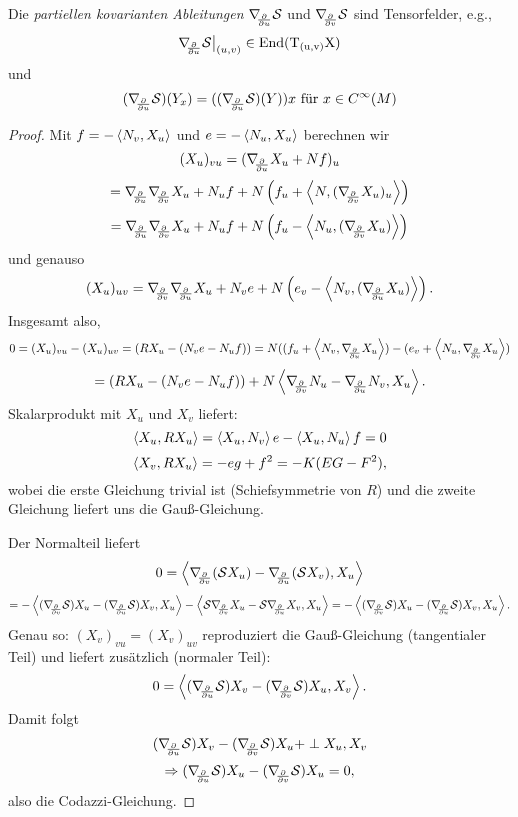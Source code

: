 \begin{remark}
	
	Die \emph{partiellen kovarianten Ableitungen} $ \nabla_{\!\!{\partial\over \partial u}} \mathcal S $ und $ \nabla_{\!\!{\partial\over \partial v}} \mathcal S $ sind Tensorfelder, e.g.,
		\[ \nabla_{\!\!{\partial\over \partial u}} \mathcal S\big|_{(u,v)} \in \mathrm{End(T_{(u,v)}X)} \] und
		\[ ( \nabla_{\!\!{\partial\over \partial u}}\mathcal S )(Y_x) = ((\nabla_{\!\!{\partial\over \partial u}} \mathcal S) (Y))x \text{ für } x \in C^\infty(M) \]
	
\end{remark}

\begin{proof}
	
	Mit $ f = - \left \langle N_v,X_u \right\rangle $ und $ e= - \left \langle N_u,X_u \right\rangle $ berechnen wir
		\[ (X_u)_{vu} = (\nabla_{\!\!{\partial\over \partial u}}X_u + Nf)_u \]
		\[ = \nabla_{\!\!{\partial\over \partial u}} \nabla_{\!\!{\partial\over \partial v}} X_u + N_{u}f + N\left (f_u+\left \langle N,(\nabla_{\!\!{\partial\over \partial v}}X_u)_u \right\rangle\right ) \]
		\[ = \nabla_{\!\!{\partial\over \partial u}} \nabla_{\!\!{\partial\over \partial v}} X_u + N_{u}f + N\left (f_u-\left \langle N_u,(\nabla_{\!\!{\partial\over \partial v}}X_u) \right\rangle\right ) \] 
	und genauso
		\[ (X_u)_{uv} = \nabla_{\!\!{\partial\over \partial v}} \nabla_{\!\!{\partial\over \partial u}} X_u + N_{v}e + N\left (e_v - \left \langle N_v,(\nabla_{\!\!{\partial\over \partial u}}X_u) \right\rangle\right ). \]
	Insgesamt also,
		\[ 0 = (X_u)_{vu} - (X_u)_{uv} = (RX_u - (N_ve - N_uf)) = N(( f_u + \left \langle N_v,\nabla_{\!\!{\partial\over \partial u}}X_u \right\rangle ) - ( e_v + \left \langle  N_u, \nabla_{\!\!{\partial\over \partial v}}X_u \right\rangle ) \]
		\[ = (RX_u - (N_ve -N_uf) ) + N \left \langle  \nabla_{\!\!{\partial\over \partial v}} N_u - \nabla_{\!\!{\partial\over \partial u}}N_v, X_u \right\rangle. \]
	Skalarprodukt mit $ X_u $ und $ X_v $ liefert:
		\[ \left \langle X_u,RX_u \right\rangle = \left \langle X_u,N_v \right\rangle e - \left \langle X_u,N_u \right\rangle f = 0 \]
		\[ \left \langle X_v,RX_u \right\rangle = -eg + f^2 = - K(EG - F^2), \]
	wobei die erste Gleichung trivial ist (Schiefsymmetrie von $ R $) und die zweite Gleichung liefert uns die Gauß-Gleichung.
	
	Der Normalteil liefert 
		\[ 0 = \left \langle \nabla_{\!\!{\partial\over \partial v}}(\mathcal S X_u) - \nabla_{\!\!{\partial\over \partial u}}(\mathcal S X_v),X_u  \right\rangle \]
		\[= - \skal{(\nabla_{\!\!{\partial\over \partial v}}\s)X_u - (\nabla_{\!\!{\partial\over \partial u}}\s)X_v,X_u} - \skal{\s \nabla_{\!\!{\partial\over \partial v}}X_u- \s \nabla_{\!\!{\partial\over \partial u}} X_v,X_u } = - \skal{(\nabla_{\!\!{\partial\over \partial v}}\s)X_u - (\nabla_{\!\!{\partial\over \partial u}}\s)X_v,X_u}. \]
	Genau so:
		$ (X_v)_{vu}=(X_v)_{uv} $ reproduziert die Gauß-Gleichung (tangentialer Teil) und liefert zusätzlich (normaler Teil):
			\[ 0 = \left \langle (\nabla_{\!\!{\partial\over \partial u}} \mathcal S)X_v - (\nabla_{\!\!{\partial\over \partial v}}\mathcal S)X_u,X_v \right\rangle. \]
		Damit folgt
			\[ (\nabla_{\!\!{\partial\over \partial u}} \mathcal S)X_v - (\nabla_{\!\!{\partial\over \partial v}}\mathcal S)X_u +\perp X_u,X_v \]
			\[ \Rightarrow (\nabla_{\!\!{\partial\over \partial u}} \mathcal S) X_u - (\nabla_{\!\!{\partial\over \partial v}}\mathcal S)X_u = 0, \]
		also die Codazzi-Gleichung.
		
	
\end{proof}


